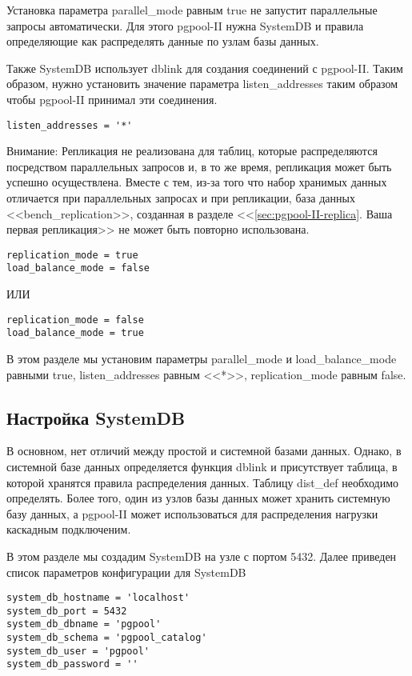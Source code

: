 Установка параметра parallel\_mode равным true не запустит параллельные запросы автоматически.
Для этого pgpool-II нужна SystemDB и правила определяющие как распределять данные по узлам базы данных.

Также SystemDB использует dblink для создания соединений с pgpool-II. Таким образом, нужно установить значение
параметра listen\_addresses таким образом чтобы pgpool-II принимал эти соединения.
\begin{lstlisting}[label=lst:pgpool23,caption=Настройка параллельного запроса]
listen_addresses = '*'
\end{lstlisting}

Внимание: Репликация не реализована для таблиц, которые распределяются посредством параллельных запросов и,
в то же время, репликация может быть успешно осуществлена. Вместе с тем, из-за того что набор хранимых данных
отличается при параллельных запросах и при репликации, база данных <<bench\_replication>>, созданная в разделе
<<\ref{sec:pgpool-II-replica}. Ваша первая репликация>> не может быть повторно использована.
\begin{lstlisting}[label=lst:pgpool24,caption=Настройка параллельного запроса]
replication_mode = true
load_balance_mode = false
\end{lstlisting}
ИЛИ
\begin{lstlisting}[label=lst:pgpool25,caption=Настройка параллельного запроса]
replication_mode = false
load_balance_mode = true
\end{lstlisting}

В этом разделе мы установим параметры parallel\_mode и load\_balance\_mode равными true,
listen\_addresses равным <<*>>, replication\_mode равным false.


\subsection{Настройка SystemDB}
В основном, нет отличий между простой и системной базами данных. Однако, в системной базе данных определяется функция
dblink и присутствует таблица, в которой хранятся правила распределения данных. Таблицу dist\_def необходимо определять.
Более того, один из узлов базы данных может хранить системную базу данных, а pgpool-II может использоваться для
распределения нагрузки каскадным подключеним.

В этом разделе мы создадим SystemDB на узле с портом 5432. Далее приведен список параметров конфигурации для SystemDB
\begin{lstlisting}[label=lst:pgpool26,caption=Настройка SystemDB]
system_db_hostname = 'localhost'
system_db_port = 5432
system_db_dbname = 'pgpool'
system_db_schema = 'pgpool_catalog'
system_db_user = 'pgpool'
system_db_password = ''
\end{lstlisting}

